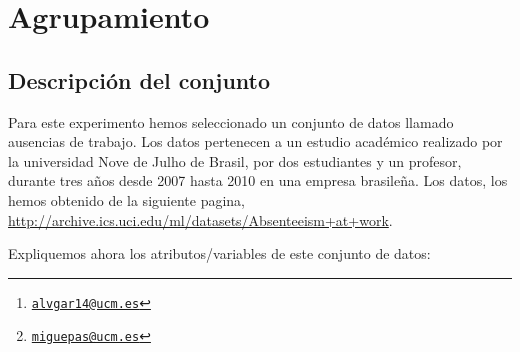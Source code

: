 \documentclass[a4paper, 11pt, twoside, openany, onecolumn, final]{memoir}
\title{\tb{Inteligencia artificial: Práctica $8$}}
\author{Álvaro García Tenorio \thanks{\texttt{\url{alvgar14@ucm.es}}}\and Miguel Pascual Domínguez\thanks{\texttt{\url{miguepas@ucm.es}}}}
\date{\today}
\begin{document}
	\maketitle
	\tableofcontents
	\chapter{Agrupamiento}
	\section{Descripción del conjunto}
	Para este experimento hemos seleccionado un conjunto de datos llamado ausencias de trabajo. Los datos pertenecen a un estudio académico realizado por la universidad Nove de Julho de Brasil, por dos estudiantes y un profesor, durante tres años desde 2007 hasta 2010 en una empresa brasileña.
	Los datos, los hemos obtenido de la siguiente pagina, \url{http://archive.ics.uci.edu/ml/datasets/Absenteeism+at+work}.
	
	Expliquemos ahora los atributos/variables de este conjunto de datos:
	
\end{document}
